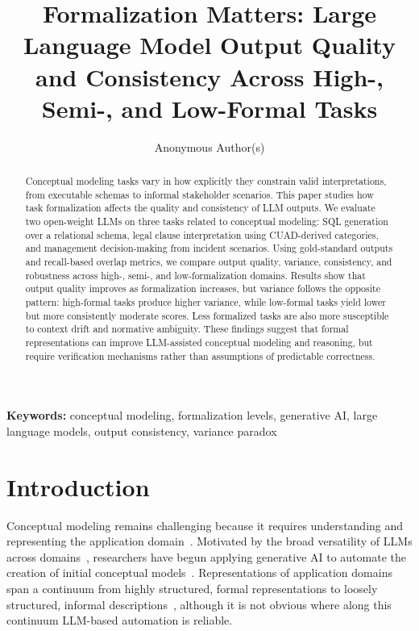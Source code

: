 \documentclass[runningheads]{llncs}
\title{Formalization Matters: Large Language Model Output Quality and Consistency Across High-, Semi-, and Low-Formal Tasks}
\author{Anonymous Author(s)}
\institute{Anonymous Institution(s)\\
\email{anonymous@domain.com}}
\begin{document}
\maketitle

\begin{abstract}
Conceptual modeling tasks vary in how explicitly they constrain valid interpretations, from executable schemas to informal stakeholder scenarios. This paper studies how task formalization affects the quality and consistency of LLM outputs. We evaluate two open-weight LLMs on three tasks related to conceptual modeling: SQL generation over a relational schema, legal clause interpretation using CUAD-derived categories, and management decision-making from incident scenarios. Using gold-standard outputs and recall-based overlap metrics, we compare output quality, variance, consistency, and robustness across high-, semi-, and low-formalization domains. Results show that output quality improves as formalization increases, but variance follows the opposite pattern: high-formal tasks produce higher variance, while low-formal tasks yield lower but more consistently moderate scores. Less formalized tasks are also more susceptible to context drift and normative ambiguity. These findings suggest that formal representations can improve LLM-assisted conceptual modeling and reasoning, but require verification mechanisms rather than assumptions of predictable correctness.
\end{abstract}

\textbf{Keywords:} conceptual modeling, formalization levels, generative AI, large language models, output consistency, variance paradox

\section{Introduction}
\label{sec:intro}
\sloppy

Conceptual modeling remains challenging because it requires understanding and representing the application domain~\cite{mylopoulos1992conceptual,olive2007conceptual}. Motivated by the broad versatility of LLMs across domains~\cite{bommasani2021opportunities,brown2020language}, researchers have begun applying generative AI to automate the creation of initial conceptual models~\cite{camara2023assessment,fill2023conceptual,haerer2023conceptual,DBLP:conf/er/SilvaMCKP25,Storey2025}.  Representations of application domains span a continuum from highly structured, formal representations to loosely structured, informal descriptions~\cite{mylopoulos1992conceptual}, although it is not obvious where along this continuum LLM-based automation is reliable.
\end{document}
